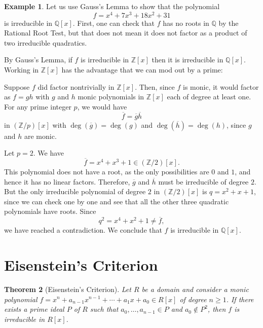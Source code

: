 \documentclass[12pt]{report}
\newtheorem{theorem}{Theorem}[chapter]
\numberwithin{equation}{section}
\numberwithin{theorem}{chapter}
\theoremstyle{definition}
\newtheorem{example}[theorem]{Example}
\newtheorem*{basic properties}{Basic Properties}
\newtheorem*{Important Remark}{Important Remark}
\begin{document}
\begin{example} 
Let us use Gauss's Lemma to show that the polynomial 
$$f = x^4 + 7x^3 + 18x^2 + 31$$ 
is irreducible in $\mathbb{Q}[x]$. First, one can check that $f$ has no roots in $\mathbb{Q}$ by
  the Rational Root Test, but that does not mean it does not factor as a product of two irreducible quadratics.

By Gauss's Lemma, if $f$ is irreducible in $\mathbb{Z}[x]$ then it is irreducible in $\mathbb{Q}[x]$.  Working in $\mathbb{Z}[x]$ has the advantage that we can mod out by a prime:

Suppose $f$ did factor nontrivially in $\mathbb{Z}[x]$. Then, since $f$ is monic, it would factor as $f = g h$ with $g$ and $h$ monic polynomials in $\mathbb{Z}[x]$ each of degree at least one. For any prime integer $p$, we would have 
$$\overline{f} = \overline{g} \overline{h}$$ 
in $(\mathbb{Z}/p)[x]$ with $\deg(\overline{g}) = \deg(g)$ and $\deg(\overline{h}) = \deg(h)$, since $g$ and $h$ are monic. 

Let $p = 2$. We have 
$$\overline{f} = x^4 + x^3 + 1 \in (\mathbb{Z}/2)[x].$$ 
This polynomial does not have a root, as the only possibilities are $0$ and $1$, and hence it has no linear factors. Therefore, $\overline{g}$ and $\overline{h}$ must be irreducible of degree $2$. 
But the only irreducible polynomial of degree $2$ in $(\mathbb{Z}/2)[x]$ is $q = x^2+x + 1$, since we can check one by one and see that all the other three quadratic polynomials have roots.
Since 
$$q^2 = x^4 + x^2 + 1 \ne \overline{f},$$ 
we have reached a contradiction. We conclude that $f$ is irreducible in $\mathbb{Q}[x]$. 
\end{example}




\section{Eisenstein's Criterion}


\begin{theorem}[Eisenstein's Criterion]  
Let $R$ be a domain and consider a monic polynomial $f = x^n + a_{n-1} x^{n-1} + \cdots + a_1 x + a_0 \in R[x]$ of degree $n \geqslant 1$. If there exists a prime ideal $P$ of $R$ such that $a_0, \dots, a_{n-1} \in P$ and $a_0 \notin P^2$, then $f$ is irreducible in $R[x]$.
\end{theorem}
\end{document}
